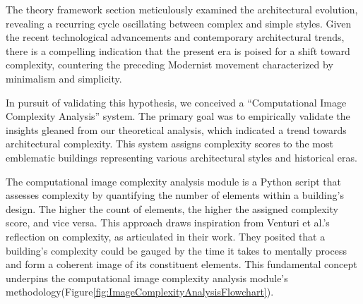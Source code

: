 
The theory framework section meticulously examined the architectural evolution, revealing a recurring cycle oscillating between complex and simple styles.
Given the recent technological advancements and contemporary architectural trends, there is a compelling indication that the present era is poised for a shift toward complexity, countering the preceding Modernist movement characterized by minimalism and simplicity.

In pursuit of validating this hypothesis, we conceived a ``Computational Image Complexity Analysis'' system.
The primary goal was to empirically validate the insights gleaned from our theoretical analysis, which indicated a trend towards architectural complexity.
This system assigns complexity scores to the most emblematic buildings representing various architectural styles and historical eras.

The computational image complexity analysis module is a Python script that assesses complexity by quantifying the number of elements within a building's design.
The higher the count of elements, the higher the assigned complexity score, and vice versa.
This approach draws inspiration from Venturi et al.'s reflection on complexity, as articulated in their work\cite{Venturi1977}.
They posited that a building's complexity could be gauged by the time it takes to mentally process and form a coherent image of its constituent elements.
This fundamental concept underpins the computational image complexity analysis module's methodology(Figure\ref{fig:ImageComplexityAnalysisFlowchart}).

